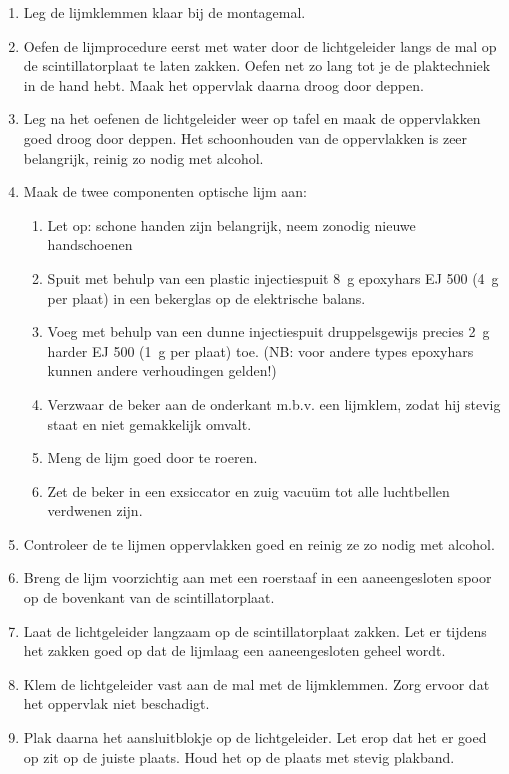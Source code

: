 \begin{enumerate}
    \item Leg de lijmklemmen klaar bij de montagemal.
    \item Oefen de lijmprocedure eerst met water door de lichtgeleider
    langs de mal op de scintillatorplaat te laten zakken. Oefen net zo
    lang tot je de plaktechniek in de hand hebt. Maak het oppervlak
    daarna droog door deppen.
    \item Leg na het oefenen de lichtgeleider weer op tafel en maak de
    oppervlakken goed droog door deppen. Het schoonhouden van de
    oppervlakken is zeer belangrijk, reinig zo nodig met alcohol.
    \item Maak de twee componenten optische lijm aan:
    \begin{enumerate}
        \item Let op: schone handen zijn belangrijk, neem zonodig nieuwe
        handschoenen
        \item Spuit met behulp van een plastic injectiespuit
        \SI{8}{\gram} epoxyhars EJ 500 (\SI{4}{\gram} per plaat) in een
        bekerglas op de elektrische balans.
        \item Voeg met behulp van een dunne injectiespuit druppelsgewijs
        precies \SI{2}{\gram} harder EJ 500 (\SI{1}{\gram} per plaat)
        toe. (NB: voor andere types epoxyhars kunnen andere verhoudingen
        gelden!)
        \item Verzwaar de beker aan de onderkant m.b.v. een lijmklem,
        zodat hij stevig staat en niet gemakkelijk omvalt.
        \item Meng de lijm goed door te roeren.
        \item Zet de beker in een exsiccator en zuig vacuüm tot alle
        luchtbellen verdwenen zijn.
    \end{enumerate}
    \item Controleer de te lijmen oppervlakken goed en reinig ze zo
    nodig met alcohol.
    \item Breng de lijm voorzichtig aan met een roerstaaf in een
    aaneengesloten spoor op de bovenkant van de scintillatorplaat.
    \item Laat de lichtgeleider langzaam op de scintillatorplaat zakken.
    Let er tijdens het zakken goed op dat de lijmlaag een aaneengesloten
    geheel wordt.
    \item Klem de lichtgeleider vast aan de mal met de lijmklemmen. Zorg
    ervoor dat het oppervlak niet beschadigt.
    \item Plak daarna het aansluitblokje op de lichtgeleider. Let erop
    dat het er goed op zit op de juiste plaats. Houd het op de plaats
    met stevig plakband.
\end{enumerate}


